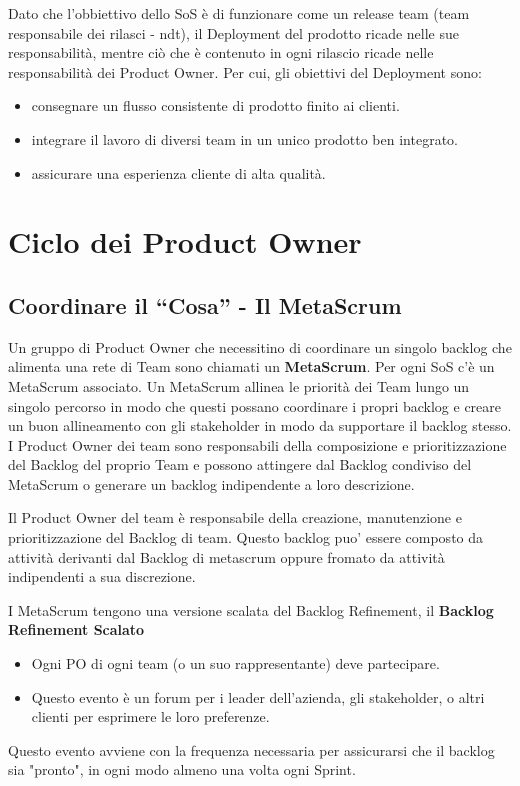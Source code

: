 \documentclass[12pt,a4paper,parskip=full]{scrartcl}
\begin{document}
Dato che l'obbiettivo dello SoS è di funzionare come un release team (team responsabile dei rilasci - ndt), il Deployment del prodotto ricade nelle sue responsabilità, mentre ciò che è contenuto in ogni rilascio ricade nelle responsabilità dei Product Owner. Per cui, gli obiettivi del Deployment sono:
\begin{itemize}
\item consegnare un flusso consistente di prodotto finito ai clienti.
\item integrare il lavoro di diversi team in un unico prodotto ben integrato.
\item assicurare una esperienza cliente di alta qualità.
\end{itemize}

\section{Ciclo dei Product Owner}
\subsection{Coordinare il ``Cosa'' - Il MetaScrum}
Un gruppo di Product Owner che necessitino di coordinare un singolo backlog che alimenta una rete di Team sono chiamati un \textbf{MetaScrum}. Per ogni SoS c'è un MetaScrum associato. Un MetaScrum allinea le priorità dei Team lungo un singolo percorso in modo che questi possano coordinare i propri backlog e creare un buon allineamento con gli stakeholder in modo da supportare il backlog stesso. I Product Owner dei team sono responsabili della composizione e prioritizzazione del Backlog del proprio Team e possono attingere dal Backlog condiviso del MetaScrum o generare un backlog indipendente a loro descrizione.

Il Product Owner del team è responsabile della creazione, manutenzione e prioritizzazione del Backlog di team. Questo backlog puo' essere composto da attività derivanti dal Backlog di metascrum oppure fromato da attività indipendenti a sua discrezione.

I MetaScrum tengono una versione scalata del Backlog Refinement, il \textbf{Backlog Refinement Scalato} 
\begin{itemize}
\item Ogni PO di ogni team (o un suo rappresentante) deve partecipare.
\item Questo evento è un forum per i leader dell'azienda, gli stakeholder, o altri clienti per esprimere le loro preferenze.
\end{itemize}
Questo evento avviene con la frequenza necessaria per assicurarsi che il backlog sia "pronto", in ogni modo almeno una volta ogni Sprint.
\end{document}
